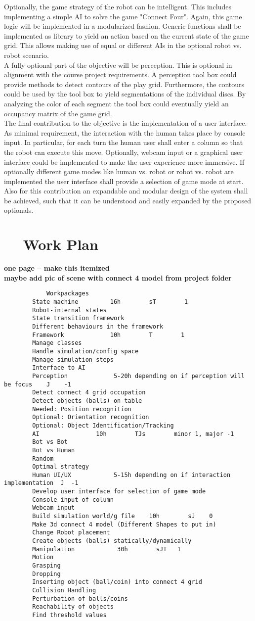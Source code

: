 \documentclass[11pt,pdftex,a4paper]{article}
\newcounter{exnum}
\newcommand{\ex}[1]{\section*{\theexnum $\quad$ #1 \stepcounter{exnum}}}
\begin{document}
	Optionally, the game strategy of the robot can be intelligent. This includes implementing a simple AI to solve the game "Connect Four".
	Again, this game logic will be implemented in a modularized fashion. Generic functions shall be implemented as library to yield an action based on the current state of the game grid. This allows making use of equal or different AIs in the optional robot vs. robot scenario.\\ 
	A fully optional part of the objective will be perception. This is optional in alignment with the course project requirements. A perception tool box could provide methods to detect contours of the play grid. Furthermore, the contours could be used by the tool box to yield segmentations of the individual discs. 
	By analyzing the color of each segment the tool box could eventually yield an occupancy matrix of the game grid.\\
	The final contribution to the objective is the implementation of a user interface. As minimal requirement, the interaction with the human takes place by console input. In particular, for each turn the human user shall enter a column so that the robot can execute this move. 
	Optionally, webcam input or a graphical user interface could be implemented to make the user experience more immersive. If optionally different game modes like human vs. robot or robot vs. robot are implemented the user interface shall provide a selection of game mode at start.
	Also for this contribution an expandable and modular design of the system shall be achieved, such that it can be understood and easily expanded by the proposed optionals.	\\
   
	\ex{Work Plan}
	\textbf{one page -- make this itemized}
	\\
	\textbf{maybe add pic of scene with connect 4 model from project folder}
	\begin{lstlisting}
			Workpackages
		State machine         16h        sT        1
		Robot-internal states
		State transition framework
		Different behaviours in the framework
		Framework             10h        T        1
		Manage classes 
		Handle simulation/config space
		Manage simulation steps
		Interface to AI
		Perception             5-20h depending on if perception will be focus    J    -1 
		Detect connect 4 grid occupation
		Detect objects (balls) on table
		Needed: Position recognition
		Optional: Orientation recognition
		Optional: Object Identification/Tracking
		AI                10h        TJs        minor 1, major -1
		Bot vs Bot
		Bot vs Human
		Random
		Optimal strategy
		Human UI/UX            5-15h depending on if interaction implementation  J  -1
		Develop user interface for selection of game mode
		Console input of column
		Webcam input
		Build simulation world/g file    10h        sJ    0
		Make 3d connect 4 model (Different Shapes to put in)
		Change Robot placement
		Create objects (balls) statically/dynamically
		Manipulation            30h        sJT   1
		Motion
		Grasping
		Dropping
		Inserting object (ball/coin) into connect 4 grid
		Collision Handling
		Perturbation of balls/coins
		Reachability of objects
		Find threshold values
	\end{lstlisting}

	
    
	
\end{document}
